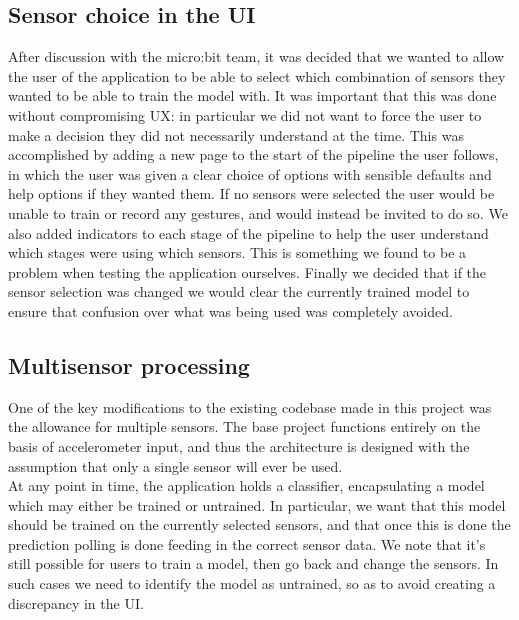 \documentclass{article}
\begin{document}
\subsection{Sensor choice in the UI}%
\label{subsec:sensorchoice}
After discussion with the micro:bit team, it was decided that we wanted to allow the user of the application to be able to select which combination of sensors they wanted to be able to train the model with. It was important that this was done without compromising UX: in particular we did not want to force the user to make a decision they did not necessarily understand at the time. This was accomplished by adding a new page to the start of the pipeline the user follows, in which the user was given a clear choice of options with sensible defaults and help options if they wanted them. If no sensors were selected the user would be unable to train or record any gestures, and would instead be invited to do so. We also added indicators to each stage of the pipeline to help the user understand which stages were using which sensors. This is something we found to be a problem when testing the application ourselves. Finally we decided that if the sensor selection was changed we would clear the currently trained model to ensure that confusion over what was being used was completely avoided. \\

\subsection{Multisensor processing}%
\label{subsec:multisensor}

One of the key modifications to the existing codebase made in this project was the allowance for multiple sensors. The base project functions entirely on the basis of accelerometer input, and thus the architecture is designed with the assumption that only a single sensor will ever be used. \\

At any point in time, the application holds a classifier, encapsulating a model which may either be trained or untrained. In particular, we want that this model should be trained on the currently selected sensors, and that once this is done the prediction polling is done feeding in the correct sensor data. We note that it's still possible for users to train a model, then go back and change the sensors. In such cases we need to identify the model as untrained, so as to avoid creating a discrepancy in the UI. \\
\end{document}
